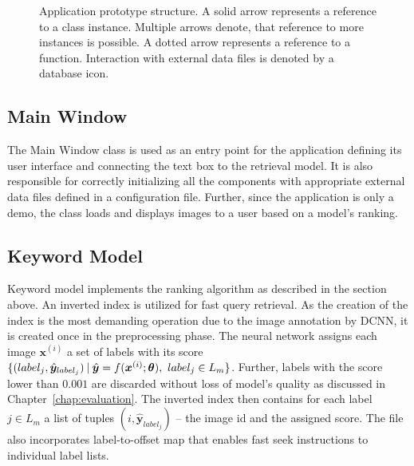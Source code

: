 \begin{figure}[ht]
	\centering
	
	
	\caption[Application prototype structure]{Application prototype structure. A solid arrow represents a reference to a class instance. Multiple arrows denote, that reference to more instances is possible. A dotted arrow represents a reference to a function. Interaction with external data files is denoted by a database icon.}
	\label{fig:wpf_app}
\end{figure}

\subsection{Main Window}
The Main Window class is used as an entry point for the application defining its user interface and connecting the text box to the retrieval model. It is also responsible for correctly initializing all the components with appropriate external data files defined in a configuration file. Further, since the application is only a demo, the class loads and displays images to a user based on a model's ranking.


\subsection{Keyword Model}
Keyword model implements the ranking algorithm as described in the section above. An inverted index is utilized for fast query retrieval. As the creation of the index is the most demanding operation due to the image annotation by DCNN, it is created once in the preprocessing phase. The neural network assigns each image $\bm{x}^{(i)}$ a set of labels with its score $\{(label_j,\hat{\bm{y}}_{label_j})\:\vert\:{\hat{\bm{y}}=f(\bm{x}^{(i)};\bm{\theta})},\  {label_j\in L_m}\}$. Further, labels with the score lower than $0.001$ are discarded without loss of model's quality as discussed in Chapter~\ref{chap:evaluation}. The inverted index then contains for each label $j\in L_m$ a list of tuples $(i, \hat{\bm{y}}_{label_j})$ -- the image id and the assigned score. The file also incorporates label-to-offset map that enables fast seek instructions to individual label lists.

